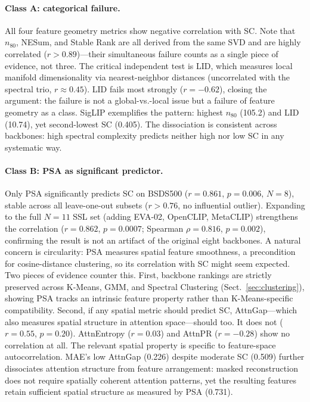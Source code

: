 \documentclass[runningheads]{llncs}
\begin{document}
\paragraph{Class A: categorical failure.}
All four feature geometry metrics show negative correlation with SC. Note that $n_{80}$, NESum, and Stable Rank are all derived from the same SVD and are highly correlated ($r > 0.89$)---their simultaneous failure counts as a single piece of evidence, not three. The critical independent test is LID, which measures local manifold dimensionality via nearest-neighbor distances (uncorrelated with the spectral trio, $r \approx 0.45$). LID fails most strongly ($r = -0.62$), closing the argument: the failure is not a global-vs.-local issue but a failure of feature geometry as a class. SigLIP exemplifies the pattern: highest $n_{80}$ (105.2) and LID (10.74), yet second-lowest SC (0.405). The dissociation is consistent across backbones: high spectral complexity predicts neither high nor low SC in any systematic way.

\paragraph{Class B: PSA as significant predictor.}
Only PSA significantly predicts SC on BSDS500 ($r = 0.861$, $p = 0.006$, $N=8$), stable across all leave-one-out subsets ($r > 0.76$, no influential outlier). Expanding to the full $N=11$ SSL set (adding EVA-02, OpenCLIP, MetaCLIP) strengthens the correlation ($r=0.862$, $p=0.0007$; Spearman $\rho=0.816$, $p=0.002$), confirming the result is not an artifact of the original eight backbones. A natural concern is circularity: PSA measures spatial feature smoothness, a precondition for cosine-distance clustering, so its correlation with SC might seem expected. Two pieces of evidence counter this. First, backbone rankings are strictly preserved across K-Means, GMM, and Spectral Clustering (Sect.~\ref{sec:clustering}), showing PSA tracks an intrinsic feature property rather than K-Means-specific compatibility. Second, if any spatial metric should predict SC, AttnGap---which also measures spatial structure in attention space---should too. It does not ($r = 0.55$, $p = 0.20$). AttnEntropy ($r = 0.03$) and AttnPR ($r = -0.28$) show no correlation at all. The relevant spatial property is specific to feature-space autocorrelation. MAE's low AttnGap (0.226) despite moderate SC (0.509) further dissociates attention structure from feature arrangement: masked reconstruction does not require spatially coherent attention patterns, yet the resulting features retain sufficient spatial structure as measured by PSA (0.731).
\end{document}
